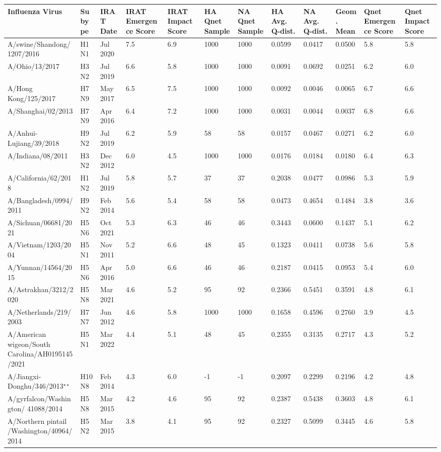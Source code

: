 \begin{tabular}{L{1.32in}|L{.35in}|L{.3in}|L{.3in}|L{.3in}|L{.35in}|L{.35in}|L{.35in}|L{.35in}|L{.32in}|L{.3in}|L{.3in}}\hline
Influenza Virus & Subype & IRAT Date &IRAT Emergence Score &IRAT Impact Score &HA Qnet Sample &NA Qnet Sample &HA Avg. Q-dist. &NA Avg. Q-dist. &Geom. Mean&Qnet Emergence Score&Qnet Impact Score \\\hline
 A/swine/Shandong/1207/2016 &H1N1& Jul  2020 &7.5&6.9&1000&1000&0.0599&0.0417&0.0500&5.8&5.8\\\hline
 A/Ohio/13/2017 &H3N2& Jul  2019 &6.6&5.8&1000&1000&0.0091&0.0692&0.0251&6.2&6.0\\\hline
 A/Hong  Kong/125/2017 &H7N9& May  2017 &6.5&7.5&1000&1000&0.0092&0.0046&0.0065&6.7&6.6\\\hline
 A/Shanghai/02/2013 &H7N9& Apr  2016 &6.4&7.2&1000&1000&0.0031&0.0044&0.0037&6.8&6.6\\\hline
 A/Anhui-Lujiang/39/2018 &H9N2& Jul  2019 &6.2&5.9&58&58&0.0157&0.0467&0.0271&6.2&6.0\\\hline
 A/Indiana/08/2011 &H3N2& Dec  2012 &6.0&4.5&1000&1000&0.0176&0.0184&0.0180&6.4&6.3\\\hline
 A/California/62/2018 &H1N2& Jul  2019 &5.8&5.7&37&37&0.2038&0.0477&0.0986&5.3&5.9\\\hline
 A/Bangladesh/0994/2011 &H9N2& Feb  2014 &5.6&5.4&58&58&0.0473&0.4654&0.1484&3.8&3.6\\\hline
 A/Sichuan/06681/2021 &H5N6& Oct  2021 &5.3&6.3&46&46&0.3443&0.0600&0.1437&5.1&6.2\\\hline
 A/Vietnam/1203/2004 &H5N1& Nov  2011 &5.2&6.6&48&45&0.1323&0.0411&0.0738&5.6&5.8\\\hline
 A/Yunnan/14564/2015 &H5N6& Apr  2016 &5.0&6.6&46&46&0.2187&0.0415&0.0953&5.4&6.0\\\hline
 A/Astrakhan/3212/2020 &H5N8& Mar  2021 &4.6&5.2&95&92&0.2366&0.5451&0.3591&4.8&6.1\\\hline
 A/Netherlands/219/2003 &H7N7& Jun  2012 &4.6&5.8&1000&1000&0.1658&0.4596&0.2760&3.9&4.5\\\hline
 A/American  wigeon/South  Carolina/AH0195145/2021 &H5N1& Mar  2022 &4.4&5.1&48&45&0.2355&0.3135&0.2717&4.3&5.2\\\hline
 A/Jiangxi-Donghu/346/2013$^{\star\star}$ &H10N8& Feb  2014 &4.3&6.0&-1&-1&0.2097&0.2299&0.2196&4.2&4.8\\\hline
 A/gyrfalcon/Washington/ 41088/2014 &H5N8& Mar  2015 &4.2&4.6&95&92&0.2387&0.5438&0.3603&4.8&6.1\\\hline
 A/Northern  pintail /Washington/40964/2014 &H5N2& Mar  2015 &3.8&4.1&95&92&0.2327&0.5099&0.3445&4.6&5.8\\\hline

\end{tabular}
